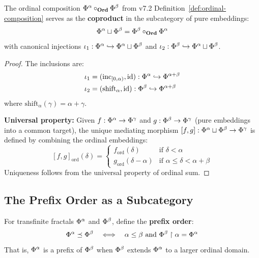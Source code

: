 \begin{proposition}
\label{prop:coproduct}
The ordinal composition $\Phi^{\alpha} \circ_{\mathbf{Ord}} \Phi^{\beta}$ from v7.2 Definition~\ref*{def:ordinal-composition} serves as the \textbf{coproduct} in the subcategory of pure embeddings:
\[
\Phi^{\alpha} \sqcup \Phi^{\beta} = \Phi^{\beta} \circ_{\mathbf{Ord}} \Phi^{\alpha}
\]
with canonical injections $\iota_1 : \Phi^{\alpha} \hookrightarrow \Phi^{\alpha} \sqcup \Phi^{\beta}$ and $\iota_2 : \Phi^{\beta} \hookrightarrow \Phi^{\alpha} \sqcup \Phi^{\beta}$.
\end{proposition}

\begin{proof}
The inclusions are:
\begin{align*}
\iota_1 &= (\mathrm{inc}_{[0,\alpha)}, \mathrm{id}) : \Phi^{\alpha} \hookrightarrow \Phi^{\alpha + \beta} \\
\iota_2 &= (\mathrm{shift}_\alpha, \mathrm{id}) : \Phi^{\beta} \hookrightarrow \Phi^{\alpha + \beta}
\end{align*}
where $\mathrm{shift}_\alpha(\gamma) = \alpha + \gamma$.

\textbf{Universal property:} Given $f : \Phi^{\alpha} \to \Phi^{\gamma}$ and $g : \Phi^{\beta} \to \Phi^{\gamma}$ (pure embeddings into a common target), the unique mediating morphism $[f, g] : \Phi^{\alpha} \sqcup \Phi^{\beta} \to \Phi^{\gamma}$ is defined by combining the ordinal embeddings:
\[
[f, g]_\mathrm{ord}(\delta) =
\begin{cases}
f_\mathrm{ord}(\delta) & \text{if } \delta < \alpha \\
g_\mathrm{ord}(\delta - \alpha) & \text{if } \alpha \leq \delta < \alpha + \beta
\end{cases}
\]
Uniqueness follows from the universal property of ordinal sum.
\end{proof}

\subsection{The Prefix Order as a Subcategory}

\begin{definition}
\label{def:prefix-order}
For transfinite fractals $\Phi^{\alpha}$ and $\Phi^{\beta}$, define the \textbf{prefix order}:
\[
\Phi^{\alpha} \preceq \Phi^{\beta} \quad \Longleftrightarrow \quad \alpha \leq \beta \text{ and } \Phi^{\beta} \restriction \alpha = \Phi^{\alpha}
\]
That is, $\Phi^{\alpha}$ is a prefix of $\Phi^{\beta}$ when $\Phi^{\beta}$ extends $\Phi^{\alpha}$ to a larger ordinal domain.
\end{definition}

